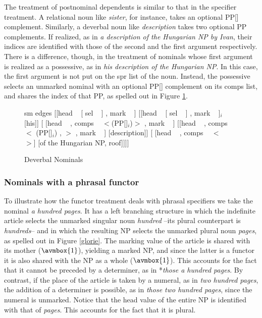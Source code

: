 \documentclass[output=paper]{langsci/langscibook}
\begin{document}
The treatment of postnominal dependents is similar to that in the specifier treatment. 
A relational noun like \emph{sister}, for instance, takes an optional PP[] complement.  
Similarly, a deverbal noun like \emph{description} takes two optional PP complements. 
If realized, as in \emph{a description of the Hungarian NP by Ivan}, 
their indices are identified with those of the second and the first argument respectively. 
There is a difference, though, in the treatment of nominals 
whose first argument is realized as a possessive, as in 
\emph{his description of the Hungarian NP}. In this case, the first argument is not put on the 
{\sc spr} list of the noun. Instead, the possessive selects an unmarked nominal with an optional 
PP[] complement on its {\sc comps} list, and shares the index of that PP, 
as spelled out in Figure \ref{possy}. 

\begin{figure}
	\centering
	\begin{forest}
sm edges
[{[{\sc head} ~  [ {\sc sel} ~ ] , {\sc mark} ~  ]}
	[{[{\sc head} ~ [ {\sc sel} ~ ] , {\sc mark} ~ ]$_{i}$} [his]]
	[{ [{\sc head} ~  , {\sc comps} ~ $<$(PP[]$_{i}$)$>$ , {\sc mark} ~  ]}
		[{[{\sc head} ~  , {\sc comps} ~ $<$ (PP[]$_{i}$) , $>$ , {\sc mark} ~ ]} [description]]
		[{ [{\sc head} ~  , {\sc comps} ~ $<$ ~ $>$]} [of the Hungarian NP, roof]]]]
	\end{forest}
	\caption{\label{possy} Deverbal Nominals }
\end{figure}


        
\subsubsection{Nominals with a phrasal functor} 
\label{sec-phrasal-spec}


To illustrate how the functor treatment deals with phrasal specifiers we 
take the nominal \emph{a hundred pages}. It has a left branching structure in
which the indefinite article selects the unmarked singular noun \emph{hundred} --its plural 
counterpart is \emph{hundreds}--  
and in which the resulting NP selects the unmarked plural noun 
\emph{pages}, as spelled out in Figure \ref{glorie}. The  
{\sc marking} value of the article is shared with its mother ($\avmbox{1}$), 
yielding a marked NP, and since the latter is a functor it is also shared with 
the NP as a whole ($\avmbox{1}$). 
This accounts for the fact that it cannot be preceded by a determiner, 
as in *\emph{those a hundred pages}. By contrast, if the place of the article is taken 
by a numeral, as in \emph{two hundred pages}, the addition of a determiner is 
possible, as in \emph{those two hundred pages}, since the numeral is unmarked. 
Notice that the {\sc head} value of the entire NP is identified with that 
of \emph{pages}. This accounts for the fact that it is plural.  
 
\end{document}
